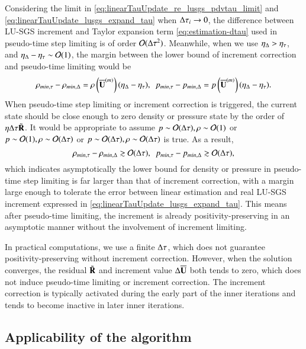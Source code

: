 Considering the limit in \eqref{eq:linearTauUpdate_re_lusgs_pdvtau_limit} 
and \eqref{eq:linearTauUpdate_lusgs_expand_tau}
when $\mathrm\Delta\tau_i\rightarrow 0$,
the difference between LU-SGS increment and 
Taylor expansion term \eqref{eq:estimation-dtau} used in pseudo-time step limiting
is of order $\mathcal{O}(\mathrm\Delta\tau^2)$. 
Meanwhile, when we use $\eta_\mathrm\Delta > \eta_\tau$,
and $\eta_\mathrm\Delta - \eta_\tau \sim \mathcal{O}(1)$,
the margin between the 
lower bound of 
increment correction and pseudo-time limiting
would be 
\begin{equation}
\rho_{min,\tau} - \rho_{min,\inc}= 
\rho\left(\uu^{(m)}\right) (\eta_\inc - \eta_\tau),\ \ 
p_{min,\tau} - p_{min,\inc}= 
p\left(\uu^{(m)}\right) (\eta_\inc - \eta_\tau).
\end{equation}
When pseudo-time step limiting or increment correction is triggered,
the current state should be close enough to zero density or 
pressure state by the order of $\eta\mathrm\Delta\tau\tilde{\mathbf{R}}$.
It would be appropriate to assume 
$p\sim\mathcal{O}(\mathrm\Delta\tau), \rho\sim\mathcal{O}(1)$ 
or $p\sim\mathcal{O}(1), \rho\sim\mathcal{O}(\mathrm\Delta\tau)$
or $p\sim\mathcal{O}(\mathrm\Delta\tau), \rho\sim\mathcal{O}(\mathrm\Delta\tau)$
is true.
As a result,
\begin{equation}
\rho_{min,\tau} - \rho_{min,\inc} \gtrsim \ord (\inc \tau),\ \ 
p_{min,\tau} - p_{min,\inc} \gtrsim \ord (\inc \tau),
\end{equation}
which indicates asymptotically
the lower bound for density or pressure in pseudo-time step limiting 
is far larger than that of increment correction, 
with a margin large enough to tolerate the error between 
linear estimation and real LU-SGS increment expressed in \eqref{eq:linearTauUpdate_lusgs_expand_tau}.
This means after pseudo-time limiting, 
the increment is already positivity-preserving 
in an asymptotic manner without the involvement of 
increment limiting.

In practical computations, we use a finite $\mathrm\Delta \tau$, which 
does not guarantee positivity-preserving without increment correction.
However, when the solution converges, the 
residual $\tilde{\mathbf{R}}$ and increment value $\mathrm\Delta\overline{\mathbf{U}}$ both tends to zero,
which does not induce pseudo-time limiting or increment correction.
The increment correction is typically activated during the early part of the inner iterations and tends to become inactive in later inner iterations. 


\subsection{Applicability of the algorithm}


